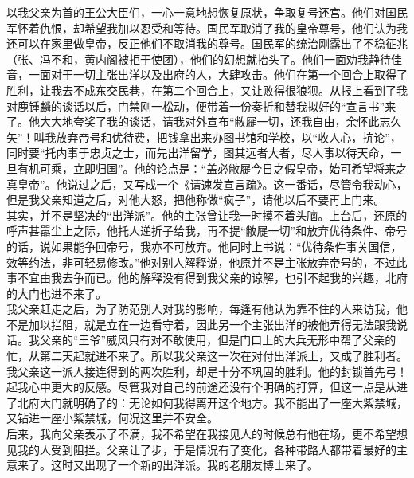 以我父亲为首的王公大臣们，一心一意地想恢复原状，争取复号还宫。他们对国民军怀着仇恨，却希望我加以忍受和等待。国民军取消了我的皇帝尊号，他们认为我还可以在家里做皇帝，反正他们不取消我的尊号。国民军的统治刚露出了不稳征兆（张、冯不和，黄内阁被拒于使团），他们的幻想就抬头了。他们一面劝我静待佳音，一面对于一切主张出洋以及出府的人，大肆攻击。他们在第一个回合上取得了胜利，让我去不成东交民巷，在第二个回合上，又让败得很狼狈。从报上看到了我对鹿锺麟的谈话以后，门禁刚一松动，便带着一份奏折和替我拟好的“宣言书”来了。他大大地夸奖了我的谈话，请我对外宣布“敝屣一切，还我自由，余怀此志久矢”！叫我放弃帝号和优待费，把钱拿出来办图书馆和学校，以“收人心，抗论”，同时要“托内事于忠贞之士，而先出洋留学，图其远者大者，尽人事以待天命，一旦有机可乘，立即归国”。他的论点是：“盖必敝屣今日之假皇帝，始可希望将来之真皇帝”。他说过之后，又写成一个《请速发宣言疏》。这一番话，尽管令我动心，但是我父亲知道之后，对他大怒，把他称做“疯子”，请他以后不要再上门来。\\

其实，并不是坚决的“出洋派”。他的主张曾让我一时摸不着头脑。上台后，还原的呼声甚嚣尘上之际，他托人递折子给我，再不提“敝屣一切”和放弃优待条件、帝号的话，说如果能争回帝号，我亦不可放弃。他同时上书说：“优待条件事关国信，效等约法，非可轻易修改。”他对别人解释说，他原并不是主张放弃帝号的，不过此事不宜由我去争而已。他的解释没有得到我父亲的谅解，也引不起我的兴趣，北府的大门也进不来了。\\

我父亲赶走之后，为了防范别人对我的影响，每逢有他认为靠不住的人来访我，他不是加以拦阻，就是立在一边看守着，因此另一个主张出洋的被他弄得无法跟我说话。我父亲的“王爷”威风只有对不敢使用，但是门口上的大兵无形中帮了父亲的忙，从第二天起就进不来了。所以我父亲这一次在对付出洋派上，又成了胜利者。\\

我父亲这一派人接连得到的两次胜利，却是十分不巩固的胜利。他的封锁首先弓！起我心中更大的反感。尽管我对自己的前途还没有个明确的打算，但这一点是从进了北府大门就明确了的：无论如何我得离开这个地方。我不能出了一座大紫禁城，又钻进一座小紫禁城，何况这里并不安全。\\

后来，我向父亲表示了不满，我不希望在我接见人的时候总有他在场，更不希望想见我的人受到阻拦。父亲让了步，于是情况有了变化，各种带路人都带着最好的主意来了。这时又出现了一个新的出洋派。我的老朋友博士来了。\\

